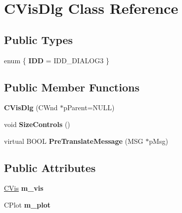 \hypertarget{class_c_vis_dlg}{\section{C\-Vis\-Dlg Class Reference}
\label{class_c_vis_dlg}
}
\subsection*{Public Types}
\begin{DoxyCompactItemize}
\item 
enum \{ {\bfseries I\-D\-D} =  I\-D\-D\-\_\-\-D\-I\-A\-L\-O\-G3
 \}
\end{DoxyCompactItemize}
\subsection*{Public Member Functions}
\begin{DoxyCompactItemize}
\item 
\hypertarget{class_c_vis_dlg_a033bca3bb2c421376e2e4f30f1cedcf3}{{\bfseries C\-Vis\-Dlg} (C\-Wnd $\ast$p\-Parent=N\-U\-L\-L)}\label{class_c_vis_dlg_a033bca3bb2c421376e2e4f30f1cedcf3}

\item 
\hypertarget{class_c_vis_dlg_a790c612589826159b3461f319a2f66cc}{void {\bfseries Size\-Controls} ()}\label{class_c_vis_dlg_a790c612589826159b3461f319a2f66cc}

\item 
\hypertarget{class_c_vis_dlg_a0508e2be0fce588761a1cf8f238fb8c0}{virtual B\-O\-O\-L {\bfseries Pre\-Translate\-Message} (M\-S\-G $\ast$p\-Msg)}\label{class_c_vis_dlg_a0508e2be0fce588761a1cf8f238fb8c0}

\end{DoxyCompactItemize}
\subsection*{Public Attributes}
\begin{DoxyCompactItemize}
\item 
\hypertarget{class_c_vis_dlg_a294b52ecfaf794c52d82f87741bd08ff}{\hyperlink{class_c_vis}{C\-Vis} {\bfseries m\-\_\-vis}}\label{class_c_vis_dlg_a294b52ecfaf794c52d82f87741bd08ff}

\item 
\hypertarget{class_c_vis_dlg_a0bc4b350ad357e3734020cb34dd364df}{C\-Plot {\bfseries m\-\_\-plot}}\label{class_c_vis_dlg_a0bc4b350ad357e3734020cb34dd364df}

\end{DoxyCompactItemize}
